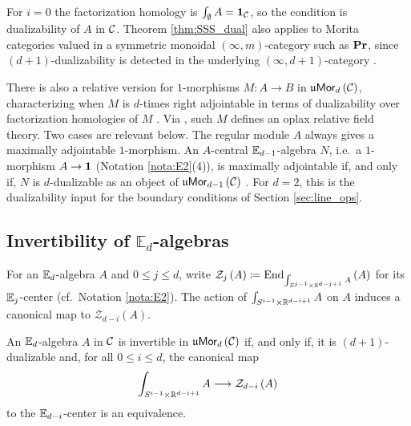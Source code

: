 For $i=0$ the factorization homology is $\int_{\emptyset}A = \mathbf{1}_{\mathcal{C}}$, so the condition is
dualizability of $A$ in $\mathcal{C}$.
Theorem \ref{thm:SSS_dual} also applies to Morita categories valued in a symmetric monoidal
$\left(\infty,m\right)$-category such as $\mathbf{Pr}$, since $\left(d+1\right)$-dualizability is
detected in the underlying $\left(\infty,d+1\right)$-category \cite[Section 1.5]{SSS}.

\begin{rmk}
\label{rmk:SSS_relative}
There is also a relative version for $1$-morphisms $M\colon A\to B$ in
$\mathfrak{u}\mathsf{Mor}_d\left(\mathcal{C}\right)$, characterizing when $M$ is $d$-times right adjointable in terms of
dualizability over factorization homologies of $M$ \cite[Theorem B]{SSS}. Via \cite{JFS}, such
$M$ defines an oplax relative field theory. Two cases are relevant below. The regular module
$A$ always gives a maximally adjointable $1$-morphism. An $A$-central $\mathbb{E}_{d-1}$-algebra $N$,
i.e.\ a $1$-morphism $A\to\mathbf{1}$
(Notation \ref{nota:E2}(4)), is
maximally adjointable if, and only if, $N$ is $d$-dualizable as an object of
$\mathfrak{u}\mathsf{Mor}_{d-1}\left(\mathcal{C}\right)$ \cite[Section 4.5]{SSS}. For $d=2$, this is the dualizability input for the boundary
conditions of Section \ref{sec:line_ops}.
\end{rmk}

\subsection{Invertibility of \texorpdfstring{$\mathbb{E}_d$}{Ed}-algebras}
\label{sec:inv_Ek}

For an $\mathbb{E}_d$-algebra $A$ and $0\leq j\leq d$, write
$\mathcal{Z}_j\left(A\right)\coloneqq\operatorname{End}_{\int_{S^{j-1}\times\mathbb{R}^{d-j+1}}A}\left(A\right)$ for its
$\mathbb{E}_j$-center (cf.\ Notation \ref{nota:E2}). The action of
$\int_{S^{i-1}\times\mathbb{R}^{d-i+1}}A$ on $A$ induces a canonical map to $\mathcal{Z}_{d-i}\left(A\right)$.

\begin{cor}
\label{cor:SSS_inv}
An $\mathbb{E}_d$-algebra $A$ in $\mathcal{C}$ is invertible in $\mathfrak{u}\mathsf{Mor}_d\left(\mathcal{C}\right)$ if, and only if, it
is $\left(d+1\right)$-dualizable and, for all $0\leq i\leq d$, the canonical map
\begin{equation*}
\int_{S^{i-1}\times\mathbb{R}^{d-i+1}}A\longrightarrow \mathcal{Z}_{d-i}\left(A\right)
\end{equation*}
to the $\mathbb{E}_{d-i}$-center is an equivalence.
\end{cor}

